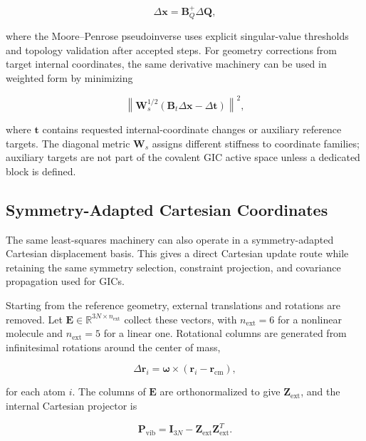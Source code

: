 \documentclass[journal=jctcce,manuscript=article,maxauthors=999]{achemso}
\begin{document}
\begin{equation}
\Delta \mathbf{x}
=
\mathbf{B}_{Q}^{+}
\Delta \mathbf{Q},
\end{equation}

where the Moore--Penrose pseudoinverse uses explicit singular-value
thresholds and topology validation after accepted steps. For geometry
corrections from target internal coordinates, the same derivative machinery
can be used in weighted form by minimizing

\begin{equation}
\left\|
\mathbf{W}_{s}^{1/2}
\left(
\mathbf{B}_{t}\Delta\mathbf{x}
-
\Delta\mathbf{t}
\right)
\right\|^2 ,
\end{equation}

where $\mathbf{t}$ contains requested internal-coordinate changes or auxiliary
reference targets. The diagonal metric $\mathbf{W}_{s}$ assigns different
stiffness to coordinate families; auxiliary targets are not part of the
covalent GIC active space unless a dedicated block is defined.


\subsection{Symmetry-Adapted Cartesian Coordinates}

The same least-squares machinery can also operate in a symmetry-adapted
Cartesian displacement basis. This gives a direct Cartesian update route while
retaining the same symmetry selection, constraint projection, and covariance
propagation used for GICs.

Starting from the reference geometry, external translations and rotations are
removed. Let $\mathbf{E}\in\mathbb{R}^{3N\times n_{\mathrm{ext}}}$ collect
these vectors, with $n_{\mathrm{ext}}=6$ for a nonlinear molecule and
$n_{\mathrm{ext}}=5$ for a linear one. Rotational columns are generated from
infinitesimal rotations around the center of mass,

\begin{equation}
\Delta\mathbf{r}_i
=
\boldsymbol{\omega}
\times
\left(
\mathbf{r}_i-\mathbf{r}_{\mathrm{cm}}
\right),
\end{equation}

for each atom $i$. The columns of $\mathbf{E}$ are orthonormalized to give
$\mathbf{Z}_{\mathrm{ext}}$, and the internal Cartesian projector is

\begin{equation}
\mathbf{P}_{\mathrm{vib}}
=
\mathbf{I}_{3N}
-
\mathbf{Z}_{\mathrm{ext}}
\mathbf{Z}_{\mathrm{ext}}^{T}.
\end{equation}
\end{document}
